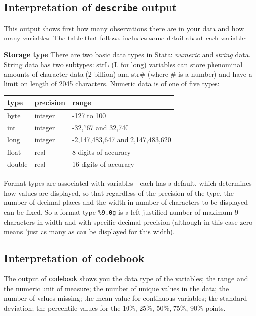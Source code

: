 \documentclass[
]{article}
\begin{document}
\hypertarget{interpretation-of-describe-output}{%
\subsection{\texorpdfstring{Interpretation of \texttt{describe} output}{Interpretation of describe output}}\label{interpretation-of-describe-output}}

This output shows first how many observations there are in your data and how many variables. The table that follows includes some detail about each variable:

\textbf{Storage type} There are two basic data types in Stata: \emph{numeric} and \emph{string} data. String data has two subtypes: strL (L for long) variables can store phenominal amounts of character data (2 billion) and str\# (where \# is a number) and have a limit on length of 2045 characters. Numeric data is of one of five types:

\begin{longtable}[]{@{}lll@{}}
\toprule
type & precision & range \\
\midrule
\endhead
byte & integer & -127 to 100 \\
int & integer & -32,767 and 32,740 \\
long & integer & -2,147,483,647 and 2,147,483,620 \\
float & real & 8 digits of accuracy \\
double & real & 16 digits of accuracy \\
\bottomrule
\end{longtable}

Format types are associated with variables - each has a default, which determines how values are displayed, so that regardless of the precision of the type, the number of decimal places and the width in number of characters to be displayed can be fixed. So a format type \texttt{\%9.0g} is a left justified number of maximum 9 characters in width and with specific decimal precision (although in this case zero means 'just as many as can be displayed for this width).

\hypertarget{interpretation-of-codebook}{%
\subsection{Interpretation of codebook}\label{interpretation-of-codebook}}

The output of \texttt{codebook} shows you the data type of the variables; the range and the numeric unit of measure; the number of unique values in the data; the number of values missing; the mean value for continuous variables; the standard deviation; the percentile values for the 10\%, 25\%, 50\%, 75\%, 90\% points.
\end{document}
